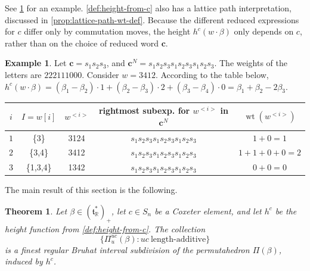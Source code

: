 \documentclass[11pt]{amsart}
\newtheorem{theorem}[Thm]{Theorem}
\theoremstyle{definition}
\newtheorem{example}[Thm]{Example}
\DeclareMathOperator{\wt}{wt}
\newcommand{\RR}{\mathbb{R}}
\def\hgt{h}
\def\pbolic^#1{^{<#1>}}
\def\bc{\mathbf{c}}
\def\hc{\hgt^c}
\def\pt{\beta}
\def\BB{{(\lie{t}_\RR^*)_+}}
\newcommand\lie[1]{{\mathfrak #1}}
\begin{document}
See \cref{ex:height} for an example.  \cref{def:height-from-c} also has a lattice path interpretation, discussed in \cref{prop:lattice-path-wt-def}. Because the different reduced expressions for $c$ differ only by commutation moves, the height $\hc(w \cdot \pt)$ only depends on $c$, rather than on the choice of reduced word $\bc$.

\begin{example}\label{ex:height}
	Let $\bc=s_1s_2s_3$, and $\bc^N=s_1s_2s_3s_1s_2s_3s_1s_2s_3$. The weights of the letters are $222111000$. Consider $w=3412$. According to the table below, $\hc( w \cdot \pt)= (\pt_1 - \pt_2) \cdot 1 + (\pt_2 - \pt_3) \cdot 2 + (\pt_3 - \pt_4) \cdot 0= \pt_1 + \pt_2 - 2 \pt_3. $
	
	\begin{center}
		\renewcommand{\arraystretch}{1.5}
		\begin{tabular}{|c|c|c|c|c|}
			\hline
			$i$ & $I=w[i]$ & $w\pbolic^{i}$ & rightmost subexp. for $w\pbolic^{i}$ in $\bc^N$ & $\wt(w\pbolic^{i})$ \\
			\hline
			$1$ & \{3\} & 3124 & $s_1s_2s_3s_1\boxed{s_2}s_3\boxed{s_1}s_2s_3$ & $1+0=1$ \\
			\hline
			$2$ & \{3,4\} & 3412 & $s_1s_2s_3s_1\boxed{s_2}\boxed{s_3}\boxed{s_1}\boxed{s_2}s_3$ & $1+1+0+0=2$ \\
			\hline
			$3$ & \{1,3,4\}   & 1342 & $s_1s_2s_3s_1s_2s_3s_1\boxed{s_2}\boxed{s_3}$ & $0+0=0$\\
			\hline
		\end{tabular}
	\end{center}
	
\end{example}

The main result of this section is the following.

\begin{theorem}\label{thm:regular-type-A}
  Let $\pt \in \BB$, let $c \in S_n$ be a Coxeter element, and let
  $\hc$ be the height function from \cref{def:height-from-c}. The collection
  \[ \{\Pi_u^{uc}(\pt): uc~\text{length-additive}\} \]
  is a finest regular Bruhat interval subdivision of the permutahedron
  $\Pi(\pt)$, induced by $\hc$.
\end{theorem}
\end{document}
